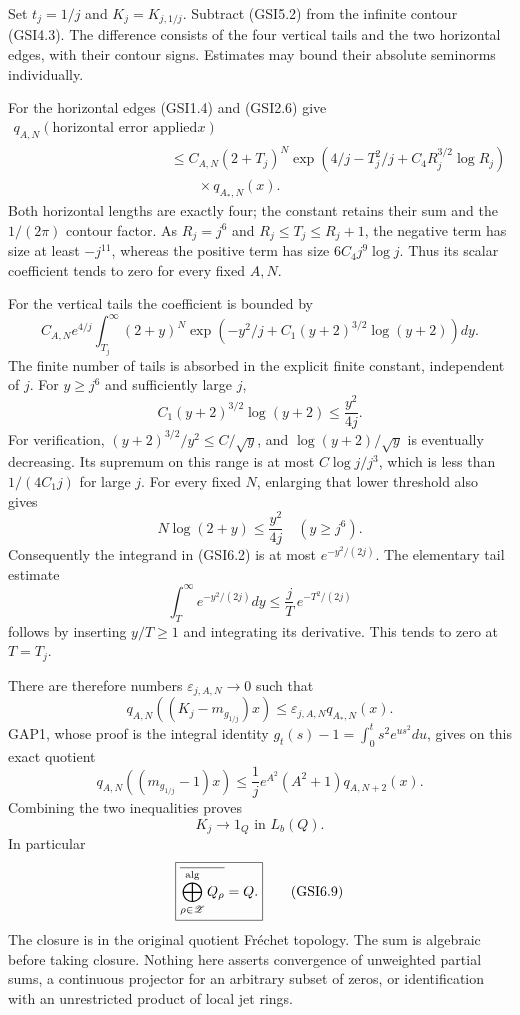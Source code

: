 Set \(t_j=1/j\) and \(K_j=K_{j,1/j}\). Subtract (GSI5.2) from the
infinite contour (GSI4.3). The difference consists of the four vertical
tails and the two horizontal edges, with their contour signs. Estimates
may bound their absolute seminorms individually.

For the horizontal edges (GSI1.4) and (GSI2.6) give \[
\begin{aligned}
q_{A,N}(\text{horizontal error applied to }x)
\\&\le C_{A,N}(2+T_j)^N
\exp\left(4/j-T_j^2/j+C_4R_j^{3/2}\log R_j\right)
\\&\qquad{}\times q_{A_*,N}(x).
\end{aligned}
\tag{GSI6.1}
\] Both horizontal lengths are exactly four; the constant retains their
sum and the \(1/(2\pi)\) contour factor. As \(R_j=j^6\) and
\(R_j\le T_j\le R_j+1\), the negative term has size at least
\(-j^{11}\), whereas the positive term has size \(6C_4j^9\log j\). Thus
its scalar coefficient tends to zero for every fixed \(A,N\).

For the vertical tails the coefficient is bounded by \[
C_{A,N}e^{4/j}\int_{T_j}^{\infty}
(2+y)^N\exp\left(-y^2/j+C_1(y+2)^{3/2}\log(y+2)\right)dy.
\tag{GSI6.2}
\] The finite number of tails is absorbed in the explicit finite
constant, independent of \(j\). For \(y\ge j^6\) and sufficiently large
\(j\), \[
C_1(y+2)^{3/2}\log(y+2)\le\frac{y^2}{4j}.
\tag{GSI6.3}
\] For verification, \((y+2)^{3/2}/y^2\le C/\sqrt y\), and
\(\log(y+2)/\sqrt y\) is eventually decreasing. Its supremum on this
range is at most \(C\log j/j^3\), which is less than \(1/(4C_1j)\) for
large \(j\). For every fixed \(N\), enlarging that lower threshold also
gives \[
N\log(2+y)\le\frac{y^2}{4j}\quad(y\ge j^6).
\tag{GSI6.4}
\] Consequently the integrand in (GSI6.2) is at most \(e^{-y^2/(2j)}\).
The elementary tail estimate \[
\int_T^\infty e^{-y^2/(2j)}dy
\le\frac jT\,e^{-T^2/(2j)}
\tag{GSI6.5}
\] follows by inserting \(y/T\ge1\) and integrating its derivative. This
tends to zero at \(T=T_j\).

There are therefore numbers \(\varepsilon_{j,A,N}\to0\) such that \[
q_{A,N}((K_j-m_{g_{1/j}})x)
\le\varepsilon_{j,A,N}q_{A_*,N}(x).
\tag{GSI6.6}
\] GAP1, whose proof is the integral identity
\(g_t(s)-1=\int_0^t s^2e^{us^2}du\), gives on this exact quotient \[
q_{A,N}((m_{g_{1/j}}-1)x)
\le\frac1j e^{A^2}(A^2+1)q_{A,N+2}(x).
\tag{GSI6.7}
\] Combining the two inequalities proves \[
\boxed{K_j\longrightarrow1_Q\text{ in }L_b(Q).}
\tag{GSI6.8}
\] In particular \[
\boxed{\overline{\bigoplus_{\rho\in\mathscr Z}^{\rm alg}Q_\rho}=Q.}
\tag{GSI6.9}
\] The closure is in the original quotient Fréchet topology. The sum is
algebraic before taking closure. Nothing here asserts convergence of
unweighted partial sums, a continuous projector for an arbitrary subset
of zeros, or identification with an unrestricted product of local jet
rings.

